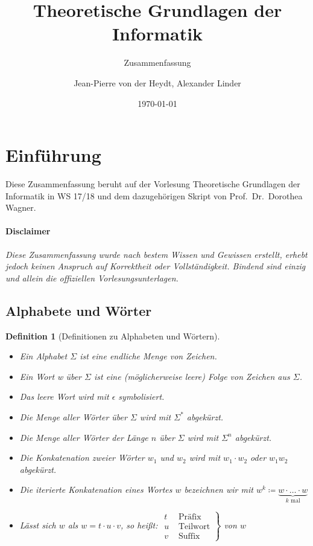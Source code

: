 \documentclass[11pt]{scrartcl}
\title{Theoretische Grundlagen der Informatik}
\subtitle{Zusammenfassung}
\author{Jean-Pierre von der Heydt, Alexander Linder}
\date{\today}
\theoremstyle{break}
\newtheorem{defi}[satz]{Definition}
\begin{document}
    \maketitle
    \pagebreak

    \tableofcontents
    \pagebreak



    \section{Einführung}
	\label{sec:einführung}

    Diese Zusammenfassung beruht auf der Vorlesung Theoretische Grundlagen der Informatik in WS 17/18 und dem dazugehörigen Skript von Prof.\ Dr.\ Dorothea Wagner.

    \paragraph{Disclaimer}
    \textit{
        Diese Zusammenfassung wurde nach bestem Wissen und Gewissen erstellt, erhebt jedoch keinen Anspruch auf Korrektheit
        oder Vollständigkeit.
        Bindend sind einzig und allein die offiziellen Vorlesungsunterlagen.
    }

    \subsection{Alphabete und Wörter}
	\label{subsec:alphabete-und-wörter}

    \begin{defi}[Definitionen zu Alphabeten und Wörtern]
        \begin{itemize}
            \item Ein Alphabet $\Sigma$ ist eine endliche Menge von Zeichen.
            \item Ein Wort w über $\Sigma$ ist eine (möglicherweise leere) Folge von Zeichen aus $\Sigma$.
            \item Das leere Wort wird mit $\epsilon$ symbolisiert.
            \item Die Menge aller Wörter über $\Sigma$ wird mit $\Sigma^*$ abgekürzt.
            \item Die Menge aller Wörter der Länge $n$ über $\Sigma$ wird mit $\Sigma^n$ abgekürzt.
            \item Die Konkatenation zweier Wörter $w_1$ und $w_2$ wird mit $w_1\cdot w_2$ oder $w_{1}w_{2}$ abgekürzt.
            \item Die iterierte Konkatenation eines Wortes $w$ bezeichnen wir mit $w^k\coloneqq \underbrace{w\cdot\dots\cdot w}_{k\text{ mal}}$
            \item Lässt sich $w$ als $w=t\cdot u\cdot v$, so heißt:
            $\left. \begin{array}{cc}
                        t &\text{ Präfix}\\
                        u &\text{ Teilwort}\\
                        v &\text{ Suffix}
            \end{array} \right\}$
            von $w$
        \end{itemize}
    \end{defi}
\end{document}
